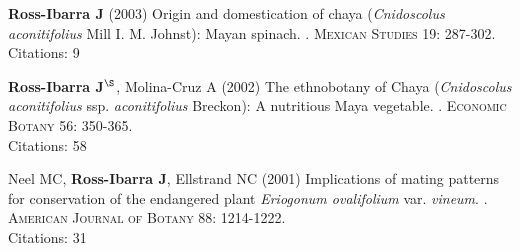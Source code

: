 \documentclass[letterpaper,10pt]{article}
\renewenvironment{itemize}{
  \begin{list}{}{
    \setlength{\leftmargin}{1.5em}
  }
}{
  \end{list}
}
\begin{document}
\begin{etaremune}
\item {\bf Ross-Ibarra J} (2003) Origin and domestication of chaya (\emph{Cnidoscolus aconitifolius} Mill I. M. Johnst): Mayan spinach. . \textsc{Mexican Studies} 19: 287-302.
\\Citations: 9\\


\item {\bf Ross-Ibarra J}$^\S$, Molina-Cruz A (2002) The ethnobotany of Chaya (\emph{Cnidoscolus aconitifolius} ssp. \emph{aconitifolius} Breckon): A nutritious Maya vegetable. . \textsc{Economic Botany} 56: 350-365.
\\Citations: 58\\


\item  Neel MC, {\bf Ross-Ibarra J}, Ellstrand NC (2001) Implications of mating patterns for conservation of the endangered plant \emph{Eriogonum ovalifolium} var. \emph{vineum}. . \textsc{American Journal of Botany} 88: 1214-1222.
\\Citations: 31\\
\end{etaremune}


\end{document}
